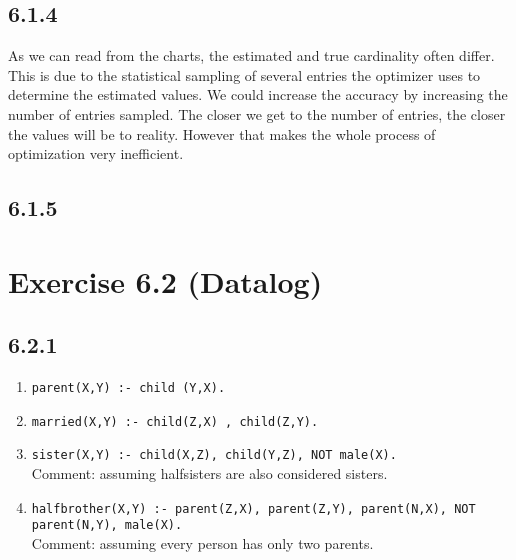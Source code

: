\documentclass[12pt]{article}
\newcommand{\code}[1]{\texttt{#1}}
\begin{document}
	\subsection*{6.1.4}
	As we can read from the charts, the estimated and true cardinality often differ. This is due to the statistical sampling of several entries the optimizer uses to determine the estimated values. We could increase the accuracy by increasing the number of entries sampled. The closer we get to the number of entries, the closer the values will be to reality. However that makes the whole process of optimization very inefficient.
	\subsection*{6.1.5}

	\section*{Exercise 6.2 (Datalog)}
	\subsection*{6.2.1}
		\begin{enumerate}[label=\alph*)]
			\item \code{parent(X,Y) :- child (Y,X).}
			\item \code{married(X,Y) :- child(Z,X) , child(Z,Y).}
			\item \code{sister(X,Y) :- child(X,Z), child(Y,Z), NOT male(X).} \\
				Comment: assuming halfsisters are also considered sisters.
			\item \code{halfbrother(X,Y) :- parent(Z,X), parent(Z,Y), parent(N,X), NOT parent(N,Y), male(X).}\\
				Comment: assuming every person has only two parents.
		\end{enumerate}
\end{document}
